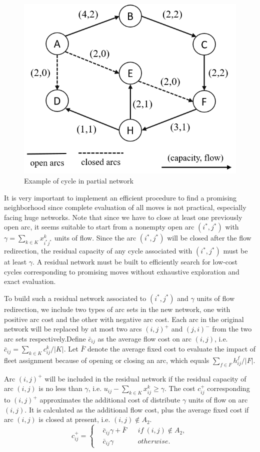 \documentclass[11pt,nonblindrev,fleqn]{article}
\begin{document}
\begin{figure}[H]
\setlength{\abovecaptionskip}{-5pt}
\setlength{\belowcaptionskip}{-5pt}
\centering
\includegraphics[width=0.5\linewidth]{F3.png}
\caption{\small Example of cycle in partial network}
\label{cycle}
\end{figure}

It is very important to implement an efficient procedure to find a promising neighborhood since complete evaluation of all moves is not practical, especially facing huge networks. Note that since we have to close at least one previously open arc, it seems suitable to start from a nonempty open arc $(i^*,j^*)$ with $\gamma = \sum_{k\in K} x_{i^*j^*}^k$ units of flow. Since the arc $(i^*,j^*)$ will be closed after the flow redirection, the residual capacity of any cycle associated with $(i^*,j^*)$ must be at least $\gamma$. A residual network must be built to efficiently search for low-cost cycles corresponding to promising moves without exhaustive exploration and exact evaluation.

To build such a residual network associated to $(i^*,j^*)$ and $\gamma$ units of flow redirection, we include two types of arc sets in the new network, one with positive arc cost and the other with negative arc cost. Each arc in the original network will be replaced by at most two arcs $(i,j)^+$ and $(j,i)^-$ from the two arc sets respectively.Define $\bar{c}_{ij}$ as the average flow cost on arc $(i,j)$, i.e. $\bar{c}_{ij} = \sum_{k\in K} c_{ij}^k / |K|$. Let $\bar{F}$ denote the average fixed cost to evaluate the impact of fleet assignment because of opening or closing an arc, which equals $\sum_{f\in F}h_{ij}^f/ |F|$.

Arc $(i,j)^+$ will be included in the residual network if the residual capacity of arc $(i,j)$ is no less than $\gamma$, i.e. $ u_{ij} - \sum_{k\in K} x_{ij}^k \geq \gamma$. The cost $c_{ij}^+$ corresponding to $(i,j)^+$ approximates the additional cost of distribute $\gamma$ units of flow on arc $(i,j)$. It is calculated as the additional flow cost, plus the average fixed cost if arc $(i,j)$ is closed at present, i.e. $(i,j) \notin A_2$.
\begin{equation*}
c_{ij}^+ = \left\{
\begin{aligned}
&\bar{c}_{ij} \gamma + \bar{F}  & & if\ (i,j) \notin A_2, \\
&\bar{c}_{ij} \gamma                 & & otherwise.
\end{aligned}
\right.
\end{equation*}
\end{document}
